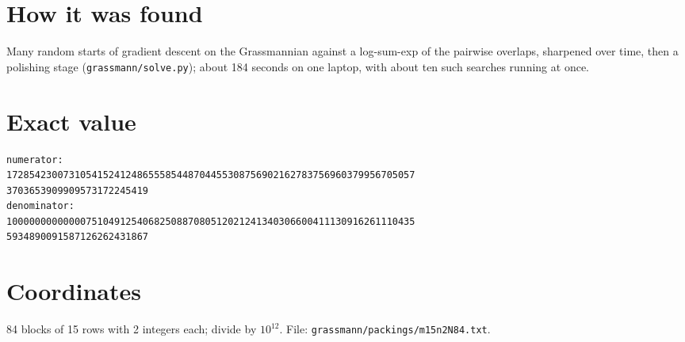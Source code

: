 \documentclass[11pt,a4paper]{article}
\begin{document}
\section{How it was found}
Many random starts of gradient descent on the Grassmannian against a log-sum-exp of the pairwise overlaps, sharpened over time, then a polishing stage (\texttt{grassmann/solve.py}); about 184 seconds on one laptop, with about ten such searches running at once.


\appendix
\section{Exact value}
{\small
\begin{verbatim}
numerator:
172854230073105415241248655585448704455308756902162783756960379956705057
3703653909909573172245419
denominator:
100000000000007510491254068250887080512021241340306600411130916261110435
5934890091587126262431867
\end{verbatim}}

\section{Coordinates}
84 blocks of 15 rows with 2 integers each; divide by $10^{12}$. File: \texttt{grassmann/packings/m15n2N84.txt}.
{\tiny
\begin{multicols}{4}
\end{multicols}}
\end{document}
